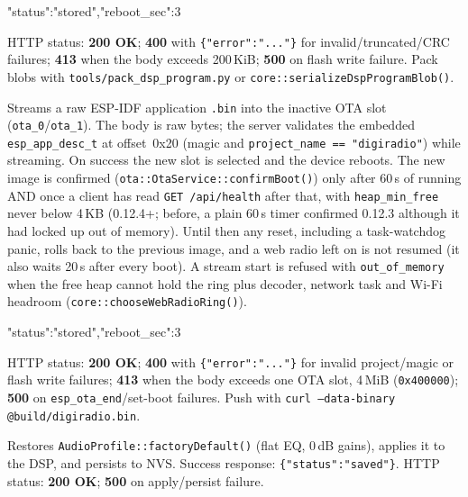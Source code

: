 \begin{drnote}
\begin{drcode}[JSON]
{"status":"stored","reboot_sec":3}
\end{drcode}
\end{drnote}

HTTP status: \textbf{200 OK}; \textbf{400} with \texttt{\{"error":"..."\}}
for invalid/truncated/CRC failures; \textbf{413} when the body exceeds
200\,KiB; \textbf{500} on flash write failure. Pack blobs with
\texttt{tools/pack\_dsp\_program.py} or \texttt{core::serializeDspProgramBlob()}.

\label{sec:api-system-ota}

Streams a raw ESP-IDF application \texttt{.bin} into the inactive OTA slot
(\texttt{ota\_0}/\texttt{ota\_1}). The body is raw bytes; the server validates
the embedded \texttt{esp\_app\_desc\_t} at offset~0x20 (magic and
\texttt{project\_name == "digiradio"}) while streaming. On success the new
slot is selected and the device reboots. The new image is confirmed
(\texttt{ota::OtaService::confirmBoot()}) only after 60\,s of running AND
once a client has read \texttt{GET /api/health} after that, with
\texttt{heap\_min\_free} never below 4\,KB (0.12.4+; before, a plain 60\,s
timer confirmed 0.12.3 although it had locked up out of memory). Until
then any reset, including a task-watchdog panic, rolls back to the previous
image, and a web radio left on is not resumed (it also waits 20\,s after
every boot). A stream start is refused with \texttt{out\_of\_memory} when
the free heap cannot hold the ring plus decoder, network task and Wi-Fi
headroom (\texttt{core::chooseWebRadioRing()}).

\begin{drnote}
\begin{drcode}[JSON]
{"status":"stored","reboot_sec":3}
\end{drcode}
\end{drnote}

HTTP status: \textbf{200 OK}; \textbf{400} with \texttt{\{"error":"..."\}}
for invalid project/magic or flash write failures;
\textbf{413} when the body exceeds one OTA slot, 4\,MiB (\texttt{0x400000});
\textbf{500} on \texttt{esp\_ota\_end}/set-boot failures. Push with
\texttt{curl --data-binary @build/digiradio.bin}.

\label{sec:api-audio-reset}

Restores \texttt{AudioProfile::factoryDefault()} (flat EQ, 0\,dB gains),
applies it to the DSP, and persists to NVS. Success response:
\texttt{\{"status":"saved"\}}. HTTP status: \textbf{200 OK}; \textbf{500}
on apply/persist failure.

